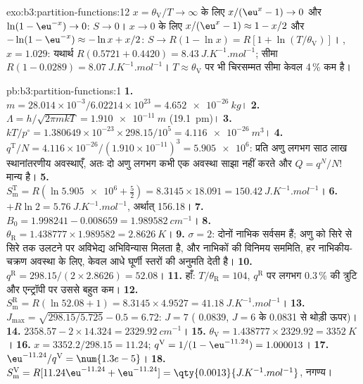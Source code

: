 \begin{solution}{exo:b3:partition-functions:12}
$x = \theta_{\mathrm V}/T \to \infty$ के लिए $x/(\eu^x - 1) \to 0$ और $\ln(1 - \eu^{-x}) \to 0$: $S \to 0$। $x \to 0$ के लिए
$x/(\eu^x - 1) \approx 1 - x/2$ और $-\ln(1 - \eu^{-x}) \approx -\ln x + x/2$: $S \to R(1 - \ln x) = R[1 + \ln(T/\theta_{\mathrm V})]$।
, $x = 1.029$: यथार्थ $R(0.5721 + 0.4420) = \qty{8.43}{J.K^{-1}.mol^{-1}}$; सीमा $R(1 - 0.0289) =
\qty{8.07}{J.K^{-1}.mol^{-1}}$। $T \approx \theta_{\mathrm V}$ पर भी चिरसम्मत सीमा केवल 4\,\% कम है।
\end{solution}

\begin{solution}{pb:b3:partition-functions:1}
\textbf{1.} $m = 28.014\times10^{-3}/6.02214\times10^{23} = \qty{4.652e-26}{kg}$।
\textbf{2.} $\Lambda = h/\sqrt{2\pi mkT} = \qty{1.910e-11}{m}$ (\qty{19.1}{pm})।
\textbf{3.} $kT/p^\circ = 1.380649\times10^{-23} \times 298.15/10^5 = \qty{4.116e-26}{m^3}$।
\textbf{4.} $q^{\mathrm T}/N = 4.116\times10^{-26}/(1.910\times10^{-11})^3 = \num{5.905e6}$: प्रति अणु लगभग साठ लाख
स्थानांतरणीय अवस्थाएँ, अतः दो अणु लगभग कभी एक अवस्था साझा नहीं करते और
$Q = q^N/N!$ मान्य है।
\textbf{5.} $S^{\mathrm T}_{\mathrm m} = R(\ln\num{5.905e6} + \frac52) = 8.3145 \times 18.091 = \qty{150.42}{J.K^{-1}.mol^{-1}}$।
\textbf{6.} $+R\ln2 = \qty{5.76}{J.K^{-1}.mol^{-1}}$, अर्थात् \num{156.18}।
\textbf{7.} $B_0 = 1.998241 - 0.008659 = \qty{1.989582}{cm^{-1}}$।
\textbf{8.} $\theta_{\mathrm R} = 1.438777 \times 1.989582 = \qty{2.8626}{K}$।
\textbf{9.} $\sigma = 2$: दोनों नाभिक सर्वसम हैं; अणु को सिरे से सिरे तक उलटने पर
अविभेद्य अभिविन्यास मिलता है, और नाभिकों की विनिमय सममिति,
हर नाभिकीय-चक्रण अवस्था के लिए, केवल आधे घूर्णी स्तरों की अनुमति देती है।
\textbf{10.} $q^{\mathrm R} = 298.15/(2 \times 2.8626) = 52.08$।
\textbf{11.} हाँ: $T/\theta_{\mathrm R} = 104$, $q^{\mathrm R}$ पर लगभग 0.3\,\% की त्रुटि और
एन्ट्रॉपी पर उससे बहुत कम।
\textbf{12.} $S^{\mathrm R}_{\mathrm m} = R(\ln52.08 + 1) = 8.3145 \times 4.9527 = \qty{41.18}{J.K^{-1}.mol^{-1}}$।
\textbf{13.} $J_{\max} = \sqrt{298.15/5.725} - 0.5 = 6.72$: $J = 7$ ( 0.0839, $J = 6$ के
0.0831 से थोड़ी ऊपर)।
\textbf{14.} $2358.57 - 2 \times 14.324 = \qty{2329.92}{cm^{-1}}$।
\textbf{15.} $\theta_{\mathrm V} = 1.438777 \times 2329.92 = \qty{3352}{K}$।
\textbf{16.} $x = 3352.2/298.15 = 11.24$; $q^{\mathrm V} = 1/(1 - \eu^{-11.24}) = 1.000013$।
\textbf{17.} $\eu^{-11.24}/q^{\mathrm V} = \num{1.3e-5}$।
\textbf{18.} $S^{\mathrm V}_{\mathrm m} = R[11.24\eu^{-11.24} + \eu^{-11.24}] = \qty{0.0013}{J.K^{-1}.mol^{-1}}$, नगण्य।

\end{solution}
